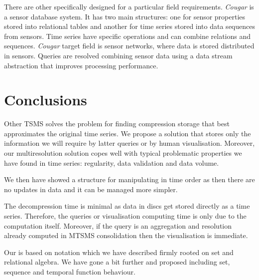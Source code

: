 There are other  specifically designed for a particular
field requirements.  \emph{Cougar}
\cite{bonnet01} is a sensor database system. It has two main
structures: one for sensor properties stored into relational tables
and another for time series stored into data sequences from
sensors. Time series have specific operations and can combine
relations and sequences. \emph{Cougar} target field is sensor networks, where
data is stored distributed in sensors. Queries are resolved combining
sensor data using a data stream abstraction that improves processing
performance.






\section{Conclusions}
\label{sec:concl-future-work}

\todo{}


Other TSMS solves the problem for finding compression storage that
best approximates the original time series. We propose a solution that
stores only the information we will require by latter queries or by
human visualisation.  Moreover, our multiresolution solution copes
well with typical problematic properties we have found in time series:
regularity, data validation and data volume.

We then have showed a structure for manipulating in time order as then there are no updates in data and it can be managed more simpler. 

The decompression time is minimal as data in discs get stored directly
as a time series. Therefore, the queries or visualisation computing
time is only due to the computation itself. Moreover, if the query is
an aggregation and resolution already computed in MTSMS consolidation
then the visualisation is immediate.


Our  is based on  notation which we have
described firmly rooted on set and relational algebra. We have gone a
bit further and proposed  including set, sequence and
temporal function behaviour.




